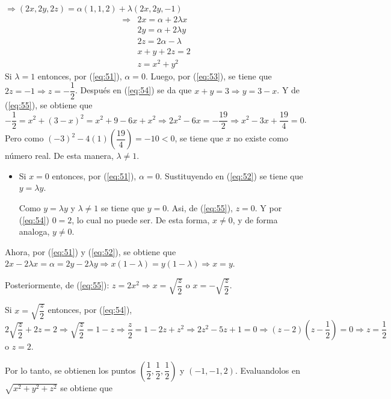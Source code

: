 \documentclass[fleqn, 12pt]{article}
\begin{document}
\begin{list}{\bfseries Ejercicio}{ \addtolength{\itemindent}{-1mm}%
    \addtolength{\labelsep}{-1mm}%
    \addtolength{\leftmargin}{-1cm}%
    \addtolength{\labelwidth}{-1cm} }
    $ \Longrightarrow (2x, 2y, 2z) = \alpha (1, 1, 2) + \lambda (2x, 2y, -1) $
    \begin{align}
        \Longrightarrow & 2x = \alpha + 2 \lambda x \label{eq:51} \\
        & 2y = \alpha + 2 \lambda y \label{eq:52} \\
        & 2z = 2 \alpha - \lambda \label{eq:53} \\
        & x + y + 2z = 2 \label{eq:54} \\
        & z = x^2 + y^2 \label{eq:55}
    \end{align}
    Si $ \lambda = 1 $ entonces, por (\ref{eq:51}), $ \alpha = 0 $. Luego, por (\ref{eq:53}), se tiene que $ 2z = -1 \Longrightarrow z = - \dfrac{1}{2} $. Después en (\ref{eq:54}) se da que $ x + y = 3 \Longrightarrow y = 3 - x $. Y de (\ref{eq:55}), se obtiene que $ - \dfrac{1}{2} = x^2 + (3 - x)^2 = x^2 + 9 - 6x + x^2 \Longrightarrow 2x^2 - 6x = - \dfrac{19}{2} \Longrightarrow x^2 - 3x + \dfrac{19}{4} = 0 $. Pero como $ (-3)^2 - 4(1) \left( \dfrac{19}{4} \right) = -10 < 0 $, se tiene que $ x $ no existe como número real. De esta manera, $ \lambda \neq 1 $.
    \begin{itemize}
        \item Si $ x = 0 $ entonces, por (\ref{eq:51}), $ \alpha = 0 $. Sustituyendo en (\ref{eq:52}) se tiene que $ y = \lambda y $.
        
        Como $ y = \lambda y $ y $ \lambda \neq 1 $ se tiene que $ y = 0 $. Asi, de (\ref{eq:55}), $ z = 0 $. Y por (\ref{eq:54}) $ 0 = 2 $, lo cual no puede ser. De esta forma, $ x \neq 0 $, y de forma analoga, $ y \neq 0 $.
    \end{itemize}
    
    Ahora, por (\ref{eq:51}) y (\ref{eq:52}), se obtiene que $ 2x - 2 \lambda x = \alpha = 2y - 2 \lambda y \Longrightarrow x(1 - \lambda) = y (1 - \lambda) \Longrightarrow x = y $.

    Posteriormente, de (\ref{eq:55}): $ z = 2x^2 \Longrightarrow x = \sqrt{\dfrac{z}{2}} $ o $ x = - \sqrt{\dfrac{z}{2}} $.

    Si $ x = \sqrt{\dfrac{z}{2}} $ entonces, por (\ref{eq:54}), $ 2 \sqrt{\dfrac{z}{2}} + 2z = 2 \Longrightarrow \sqrt{\dfrac{z}{2}} = 1 - z \Longrightarrow \dfrac{z}{2} = 1 - 2z + z^2 \Longrightarrow 2z^2 - 5z + 1 = 0 \Longrightarrow (z-2) \left( z - \dfrac{1}{2} \right) = 0 \Longrightarrow z = \dfrac{1}{2} $ o $ z = 2 $.

    Por lo tanto, se obtienen los puntos $ \left( \dfrac{1}{2}, \dfrac{1}{2}, \dfrac{1}{2} \right) $ y $ (-1,-1,2) $. Evaluandolos en $ \sqrt{x^2 + y^2 + z^2} $ se obtiene que


\end{list}
\end{document}
